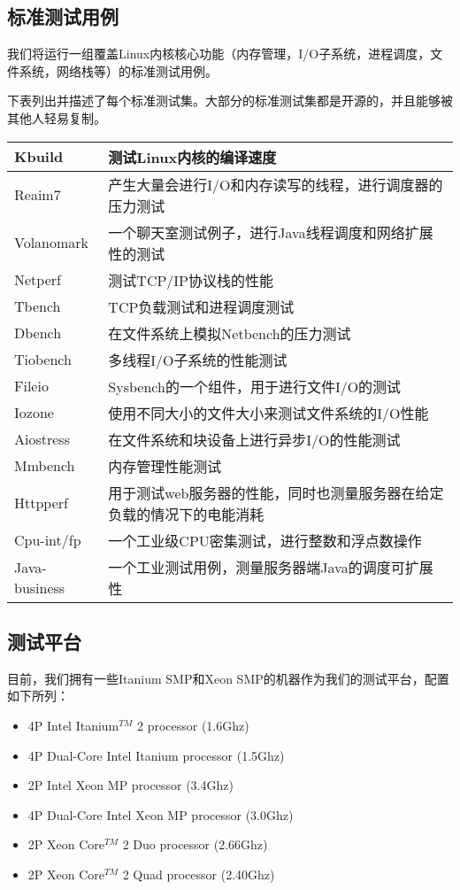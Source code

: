 \subsection{标准测试用例}
我们将运行一组覆盖Linux内核核心功能（内存管理，I/O子系统，进程调度，文件系统，网络栈等）的标准测试用例。

下表列出并描述了每个标准测试集。大部分的标准测试集都是开源的，并且能够被其他人轻易复制。



\tabletail{\hline}

\begin{supertabular}{|p{2.5cm}|p{10.3cm}|}
\hline
Kbuild & 测试Linux内核的编译速度\\
\hline
Reaim7 & 产生大量会进行I/O和内存读写的线程，进行调度器的压力测试\\
\hline
Volanomark & 一个聊天室测试例子，进行Java线程调度和网络扩展性的测试\\
\hline 
Netperf & 测试TCP/IP协议栈的性能\\
\hline
Tbench & TCP负载测试和进程调度测试\\
\hline
Dbench & 在文件系统上模拟Netbench的压力测试\\
\hline
Tiobench & 多线程I/O子系统的性能测试\\
\hline
Fileio & Sysbench的一个组件，用于进行文件I/O的测试\\
\hline
Iozone & 使用不同大小的文件大小来测试文件系统的I/O性能\\
\hline
Aiostress & 在文件系统和块设备上进行异步I/O的性能测试\\
\hline
Mmbench & 内存管理性能测试\\
\hline
Httpperf & 用于测试web服务器的性能，同时也测量服务器在给定负载的情况下的电能消耗\\
\hline
Cpu-int/fp & 一个工业级CPU密集测试，进行整数和浮点数操作\\
\hline
Java-business & 一个工业测试用例，测量服务器端Java的调度可扩展性\\
\end{supertabular}


\subsection{测试平台}
目前，我们拥有一些Itanium SMP和Xeon SMP的机器作为我们的测试平台，配置如下所列：

\begin{itemize}
\item 4P Intel Itanium$^{TM}$ 2 processor (1.6Ghz)
\item 4P Dual-Core Intel Itanium processor (1.5Ghz) 
\item 2P Intel Xeon MP processor (3.4Ghz)
\item 4P Dual-Core Intel Xeon MP processor (3.0Ghz) 
\item 2P Xeon Core$^{TM}$ 2 Duo processor (2.66Ghz)
\item 2P Xeon Core$^{TM}$ 2 Quad processor (2.40Ghz)
\end{itemize}
